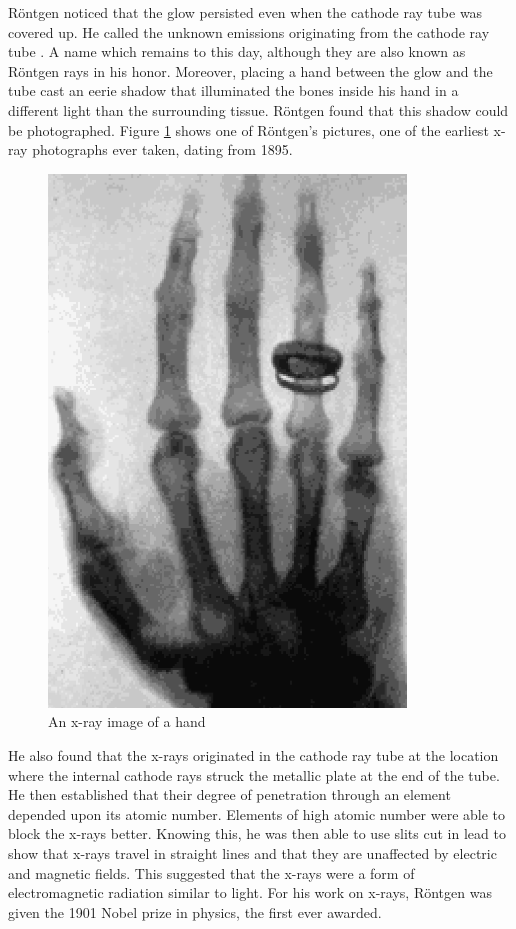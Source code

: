 \documentclass[12pt, a4paper, oneside, openright, titlepage]{book}
\begin{document}
\noindent Röntgen noticed that the glow persisted even when the cathode ray tube was covered up. He called the unknown emissions originating from the cathode ray tube . A name which remains to this day, although they are also known as Röntgen rays in his honor. Moreover, placing a hand between the glow and the tube cast an eerie shadow that illuminated the bones inside his hand in a different light than the surrounding tissue. Röntgen found that this shadow could be photographed. Figure \ref{fig:XR2} shows one of Röntgen’s pictures, one of the earliest x-ray photographs ever taken, dating from 1895. 

\begin{figure}[H]
    \centering
    \includegraphics[scale = 0.8]{Images/XR2.PNG}
    \caption{An x-ray image of a hand}
    \label{fig:XR2}
\end{figure}

\noindent He also found that the x-rays originated in the cathode ray tube at the location where the internal cathode rays struck the metallic plate at the end of the tube. He then established that their degree of penetration through an element depended upon its atomic number. Elements of high atomic number were able to block the x-rays better. Knowing this, he was then able to use slits cut in lead to show that x-rays travel in straight lines and that they are unaffected by electric and magnetic fields. This suggested that the x-rays were a form of electromagnetic radiation similar to light. For his work on x-rays, Röntgen was given the 1901 Nobel prize in physics, the first ever awarded.
\end{document}
